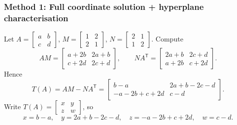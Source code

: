 \documentclass[12pt]{article}
\begin{document}
\subsubsection{Method 1: Full coordinate solution + hyperplane characterisation}
Let $A=\begin{bmatrix}a&b\\c&d\end{bmatrix}$, $M=\begin{bmatrix}1&2\\2&1\end{bmatrix}$, $N=\begin{bmatrix}2&1\\1&2\end{bmatrix}$.
Compute
\[
AM=\begin{bmatrix}a+2b&2a+b\\c+2d&2c+d\end{bmatrix},\qquad
NA^{\mathsf T}=\begin{bmatrix}2a+b&2c+d\\a+2b&c+2d\end{bmatrix}.
\]
Hence
\[
T(A)=AM-NA^{\mathsf T}
=\begin{bmatrix}
b-a & 2a+b-2c-d\\
-a-2b+c+2d & c-d
\end{bmatrix}.
\]
Write $T(A)=\begin{bmatrix}x&y\\z&w\end{bmatrix}$, so
\[
x=b-a,\quad y=2a+b-2c-d,\quad z=-a-2b+c+2d,\quad w=c-d.
\]
\medskip
\end{document}
